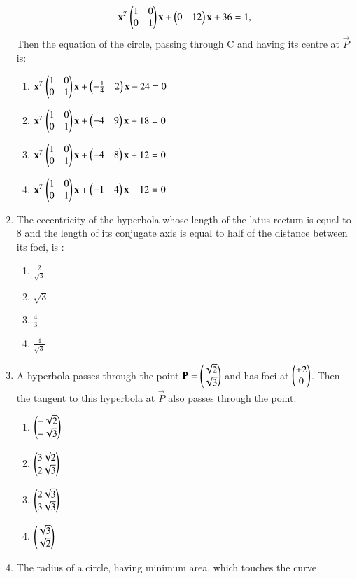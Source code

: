 \begin{enumerate}[label=\arabic*.,ref=\thesubsection.\theenumi]
    \begin{align}
    \mathbf{x}^T\begin{pmatrix}1&0\\0&1\end{pmatrix}\mathbf{x}+\begin{pmatrix}0&12\end{pmatrix}\mathbf{x}+36=1,
    \end{align} Then the equation of the circle, passing through C and having its centre at $\vec{P}$ is:
    \begin{enumerate}
    \item $\mathbf{x}^T\begin{pmatrix}1&0\\0&1\end{pmatrix}\mathbf{x}+\begin{pmatrix}-\frac{1}{4}&2\end{pmatrix}\mathbf{x}-24=0$
    \item $\mathbf{x}^T\begin{pmatrix}1&0\\0&1\end{pmatrix}\mathbf{x}+\begin{pmatrix}-4&9\end{pmatrix}\mathbf{x}+18=0$
    \item $\mathbf{x}^T\begin{pmatrix}1&0\\0&1\end{pmatrix}\mathbf{x}+\begin{pmatrix}-4&8\end{pmatrix}\mathbf{x}+12=0$    
    \item $\mathbf{x}^T\begin{pmatrix}1&0\\0&1\end{pmatrix}\mathbf{x}+\begin{pmatrix}-1&4\end{pmatrix}\mathbf{x}-12=0$
    \end{enumerate}
    \item The eccentricity of the hyperbola whose length of the latus rectum is equal to 8 and the length of its conjugate axis is equal to half of the distance between its foci, is :
    \begin{enumerate}
    \item $\frac{2}{\sqrt{3}}$
    \item $\sqrt{3}$
    \item $\frac{4}{3}$
    \item $\frac{4}{\sqrt{3}}$
    \end{enumerate}
    \item A hyperbola passes through the point $\mathbf{P}=\begin{pmatrix}\sqrt{2}\\\sqrt{3}\end{pmatrix}$ and has foci at 
    $\begin{pmatrix}\pm2\\0\end{pmatrix}$. Then the tangent to this hyperbola at $\vec{P}$ also passes through the point:
    \begin{enumerate}
    \item $\begin{pmatrix}-\sqrt{2}\\-\sqrt{3}\end{pmatrix}$
    \item $\begin{pmatrix}3\sqrt{2}\\2\sqrt{3}\end{pmatrix}$
    \item $\begin{pmatrix}2\sqrt{3}\\3\sqrt{3}\end{pmatrix}$
    \item $\begin{pmatrix}\sqrt{3}\\\sqrt{2}\end{pmatrix}$
    \end{enumerate}
    \item The radius of a circle, having minimum area, which touches the curve 

\end{enumerate}

